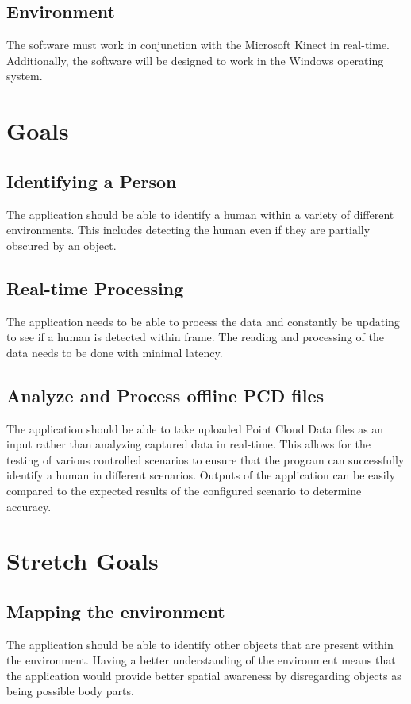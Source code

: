 \documentclass{article}
\begin{document}
\subsection{Environment}
The software must work in conjunction with the Microsoft Kinect in real-time. Additionally, the software will be designed to work in the Windows operating system.

\newpage
\section{Goals}   

\subsection{Identifying a Person}
The application should be able to identify a human within a variety of different environments. This includes detecting the human even if they are partially obscured by an object.

\subsection{Real-time Processing}
The application needs to be able to process the data and constantly be updating to see if a human is detected within frame. The reading and processing of the data needs to be done with minimal latency.

\subsection{Analyze and Process offline PCD files}
The application should be able to take uploaded Point Cloud Data files as an input rather than analyzing captured data in real-time. This allows for the testing of various controlled scenarios to ensure that the program can successfully identify a human in different scenarios. Outputs of the application can be easily compared to the expected results of the configured scenario to determine accuracy.
        
\newpage
\section{Stretch Goals}

\subsection{Mapping the environment}
The application should be able to identify other objects that are present within the environment. Having a better understanding of the environment means that the application would provide better spatial awareness by disregarding objects as being possible body parts.
\end{document}
